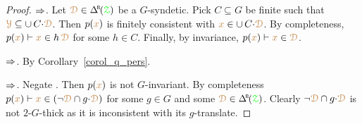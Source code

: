 \begin{proof}
  $\Rightarrow$.
  Let $\mrD\in\BDelta(\grZ)$ be a $G$-syndetic.
  Pick $C\subseteq G$ be finite such that ${\color{brown}\EuScript Y}\subseteq\cup\,C{\cdot}{\color{brown}\EuScript D}$.
  Then $p({\color{brown} x})$ is finitely consistent with ${\color{brown} x}\in\cup\,C{\cdot}{\color{brown}\EuScript D}$.
  By completeness, $p({\color{brown} x})\vdash {\color{brown}x}\in h\,{\color{brown}\EuScript D}$ for some $h\in C$.
  Finally, by invariance, $p({\color{brown} x})\vdash{\color{brown}x}\in{\color{brown}\EuScript D}$.
  
  $\Rightarrow$.
  By Corollary~\ref{corol_q_pers}.

  $\Rightarrow$.
  Negate .
  Then $p({\color{brown} x})$ is not $G$-invariant.
  By completeness $p({\color{brown} x})\vdash{\color{brown}x}\in(\neg{\color{brown}\EuScript D}\cap g{\cdot}{\color{brown}\EuScript D})$ for some $g\in G$ and some $\mrD\in\BDelta(\grZ)$.
  Clearly $\neg{\color{brown}\EuScript D}\cap g{\cdot}{\color{brown}\EuScript D}$ is not $2$-$G$-thick as it is inconsistent with its $g$-translate.
\end{proof}




